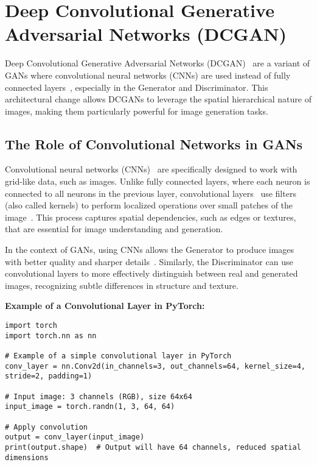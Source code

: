 \section{Deep Convolutional Generative Adversarial Networks (DCGAN)}
Deep Convolutional Generative Adversarial Networks (DCGAN)~\cite{radford2015unsupervised} are a variant of GANs where convolutional neural networks (CNNs) are used instead of fully connected layers~\cite{luo2021case}, especially in the Generator and Discriminator. This architectural change allows DCGANs to leverage the spatial hierarchical nature of images, making them particularly powerful for image generation tasks. 

\subsection{The Role of Convolutional Networks in GANs}
Convolutional neural networks (CNNs)~\cite{lecun2015deep} are specifically designed to work with grid-like data, such as images. Unlike fully connected layers, where each neuron is connected to all neurons in the previous layer, convolutional layers~\cite{radford2015unsupervised} use filters (also called kernels) to perform localized operations over small patches of the image~\cite{lecun2015deep, o2015cnn}. This process captures spatial dependencies, such as edges or textures, that are essential for image understanding and generation.

In the context of GANs, using CNNs allows the Generator to produce images with better quality and sharper details~\cite{goodfellow2014generative, radford2015unsupervised}. Similarly, the Discriminator can use convolutional layers to more effectively distinguish between real and generated images, recognizing subtle differences in structure and texture.

\textbf{Example of a Convolutional Layer in PyTorch:}

\begin{lstlisting}[style=python]
import torch
import torch.nn as nn

# Example of a simple convolutional layer in PyTorch
conv_layer = nn.Conv2d(in_channels=3, out_channels=64, kernel_size=4, stride=2, padding=1)

# Input image: 3 channels (RGB), size 64x64
input_image = torch.randn(1, 3, 64, 64)

# Apply convolution
output = conv_layer(input_image)
print(output.shape)  # Output will have 64 channels, reduced spatial dimensions
\end{lstlisting}

